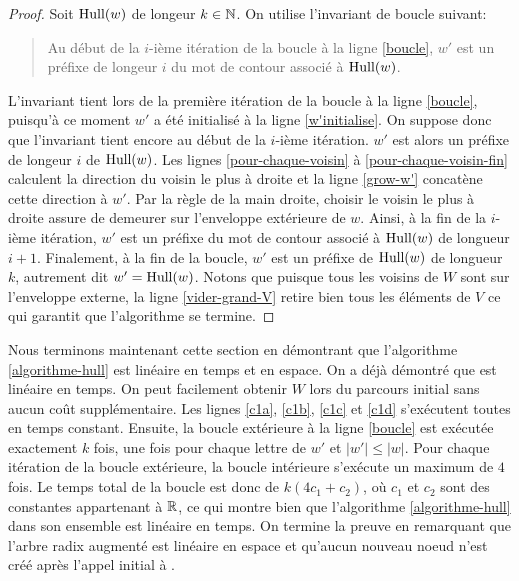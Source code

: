 \begin{proof}
Soit $\text{Hull}(w)$ de longeur $k\in \mathbb{N}$. On utilise l'invariant de boucle suivant:

\blockquote{Au début de la $i$-ième itération de la boucle à la ligne \ref{boucle}, $w'$ est un préfixe de longeur $i$ du mot de contour associé à $\text{Hull}(w)$.}

L'invariant tient lors de la première itération de la boucle à la ligne \ref{boucle}, puisqu'à ce moment $w'$ a été initialisé à la ligne \ref{w'initialise}. On suppose donc que l'invariant tient encore au début de la $i$-ième itération. $w'$ est alors un préfixe de longeur $i$ de $\text{Hull}(w)$. Les lignes \ref{pour-chaque-voisin} à \ref{pour-chaque-voisin-fin} calculent la direction du voisin le plus à droite et la ligne \ref{grow-w'} concatène cette direction à $w'$. Par la règle de la main droite, choisir le voisin le plus à droite assure de demeurer sur l'enveloppe extérieure de $w$. Ainsi, à la fin de la $i$-ième itération, $w'$ est un préfixe du mot de contour associé à $\text{Hull}(w)$ de longueur $i+1$. Finalement, à la fin de la boucle, $w'$ est un préfixe de $\text{Hull}(w)$ de longueur $k$, autrement dit $w'=\text{Hull}(w)$. Notons que puisque tous les voisins de $W$ sont sur l'enveloppe externe, la ligne \ref{vider-grand-V} retire bien tous les éléments de $V$ ce qui garantit que l'algorithme se termine.
\end{proof}

Nous terminons maintenant cette section en démontrant que l'algorithme \ref{algorithme-hull} est linéaire en temps et en espace. On a déjà démontré que \parcours est linéaire en temps. On peut facilement obtenir $W$ lors du parcours initial sans aucun coût supplémentaire. Les lignes \ref{c1a}, \ref{c1b}, \ref{c1c} et \ref{c1d} s'exécutent toutes en temps constant. Ensuite, la boucle extérieure à la ligne \ref{boucle} est exécutée exactement $k$ fois, une fois pour chaque lettre de $w'$ et $|w'| ≤ |w|$. Pour chaque itération de la boucle extérieure, la boucle intérieure s'exécute un maximum de $4$ fois. Le temps total de la boucle est donc de $k(4 c_1 + c_2)$, où $c_1$ et $c_2$ sont des constantes appartenant à $\mathbb{R}$, ce qui montre bien que l'algorithme \ref{algorithme-hull} dans son ensemble est linéaire en temps. On termine la preuve en remarquant que l'arbre radix augmenté est linéaire en espace et qu'aucun nouveau noeud n'est créé après l'appel initial à \parcours.